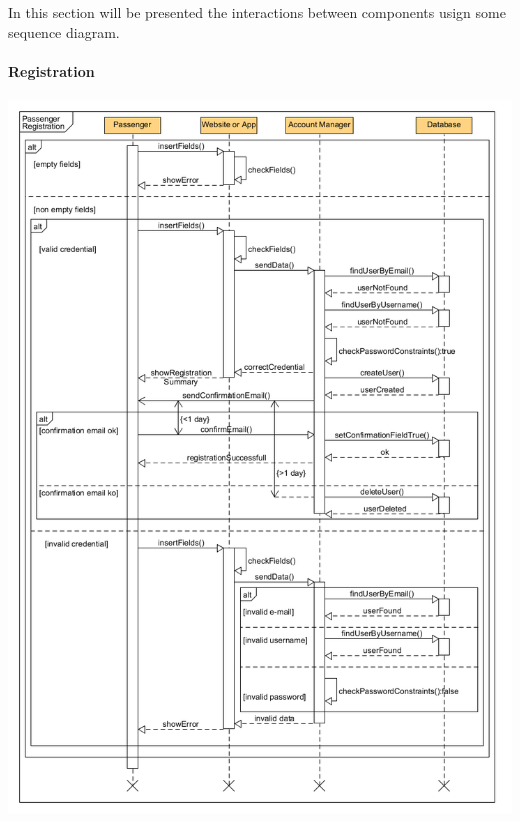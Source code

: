 In this section will be presented the interactions between components usign some sequence diagram.
\newpage
\paragraph{Registration}
		\begin{center}
			\includegraphics[width=\textwidth]{diagrams/PassengerRegistration.png}
		\end{center}
